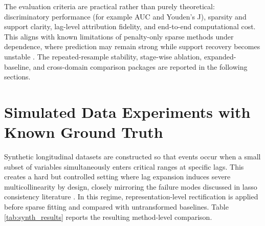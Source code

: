 The evaluation criteria are practical rather than purely theoretical: discriminatory performance (for example AUC and Youden's J), sparsity and support clarity, lag-level attribution fidelity, and end-to-end computational cost. This aligns with known limitations of penalty-only sparse methods under dependence, where prediction may remain strong while support recovery becomes unstable \autocites{PZhao2006model,freijeirogonzalez2022}. The repeated-resample stability, stage-wise ablation, expanded-baseline, and cross-domain comparison packages are reported in the following sections.

\section{Simulated Data Experiments with Known Ground Truth}

Synthetic longitudinal datasets are constructed so that events occur when a small subset of variables simultaneously enters critical ranges at specific lags. This creates a hard but controlled setting where lag expansion induces severe multicollinearity by design, closely mirroring the failure modes discussed in lasso consistency literature \autocites{PZhao2006model,freijeirogonzalez2022}. In this regime, representation-level rectification is applied before sparse fitting and compared with untransformed baselines. Table \ref{tab:synth_results} reports the resulting method-level comparison.

